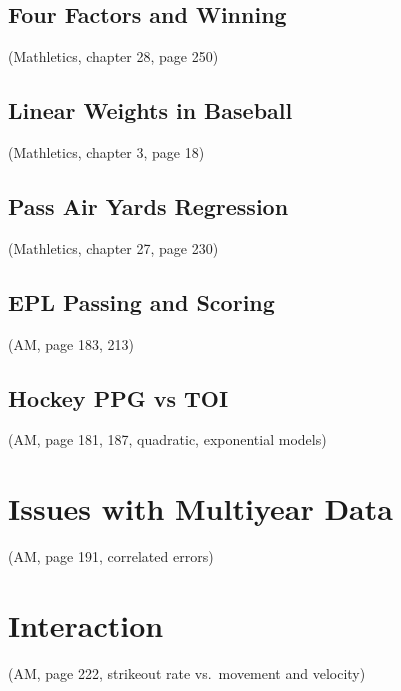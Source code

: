 \documentclass[
  11pt,
]{book}
\theoremstyle{definition}
\theoremstyle{definition}
\theoremstyle{definition}
\theoremstyle{definition}
\theoremstyle{remark}
\begin{document}
\hypertarget{four-factors-and-winning}{%
\subsection{Four Factors and Winning}\label{four-factors-and-winning}}

(Mathletics, chapter 28, page 250)

\hypertarget{linear-weights-in-baseball}{%
\subsection{Linear Weights in Baseball}\label{linear-weights-in-baseball}}

(Mathletics, chapter 3, page 18)

\hypertarget{pass-air-yards-regression}{%
\subsection{Pass Air Yards Regression}\label{pass-air-yards-regression}}

(Mathletics, chapter 27, page 230)

\hypertarget{epl-passing-and-scoring}{%
\subsection{EPL Passing and Scoring}\label{epl-passing-and-scoring}}

(AM, page 183, 213)

\hypertarget{hockey-ppg-vs-toi}{%
\subsection{Hockey PPG vs TOI}\label{hockey-ppg-vs-toi}}

(AM, page 181, 187, quadratic, exponential models)

\hypertarget{issues-with-multiyear-data}{%
\section{Issues with Multiyear Data}\label{issues-with-multiyear-data}}

(AM, page 191, correlated errors)

\hypertarget{interaction}{%
\section{Interaction}\label{interaction}}

(AM, page 222, strikeout rate vs.~movement and velocity)
\end{document}
